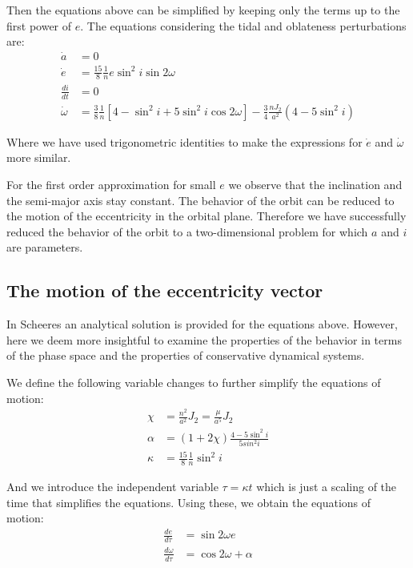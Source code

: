 Then the equations above can be simplified by keeping only the terms up to the first power of $e$. The equations considering the tidal and oblateness perturbations are:
\begin{align}
\dot{a} &= 0\\
\dot{e} &= \frac{15}{8} \frac{1}{n} e \sin^2 i \sin 2\omega\\
\frac{di}{dt} &= 0\\
\dot{\omega} &= \frac{3}{8} \frac{1}{n}\left[4 - \sin^2 i+ 5 \sin^2 i \cos 2\omega \right] -\frac{3}{4} \frac{n J_2 }{a^2} \left(4 - 5 \sin^2 i\right)
\end{align}

Where we have used trigonometric identities to make the expressions for $\dot{e}$ and $\dot{\omega}$ more similar.

For the first order approximation for small $e$ we observe that the inclination and the semi-major axis stay constant. The behavior of the orbit can be reduced to the motion of the eccentricity in the orbital plane. Therefore we have successfully reduced the behavior of the orbit to a two-dimensional problem for which $a$ and $i$ are parameters.

\subsection{The motion of the eccentricity vector}
In Scheeres \cite{scheeres2001stability} an analytical solution is provided for the equations above. However, here we deem more insightful to examine the properties of the behavior in terms of the phase space and the properties of conservative dynamical systems.

We define the following variable changes to further simplify the equations of motion:
\begin{align}
\chi &= \frac{n^2}{a^2} J_2 = \frac{\mu}{a^5} J_2 \\
\alpha &= (1+ 2\chi) \frac{4 - 5 \sin^2 i}{5 sin^2 i} \\
\kappa &= \frac{15}{8} \frac{1}{n} \sin^2 i
\end{align}

And we introduce the independent variable $\tau = \kappa t$ which is just a scaling of the time that simplifies the equations. Using these, we obtain the equations of motion:
\begin{align}
\frac{de}{d\tau} &= \sin 2\omega e \\
\label{domegadtau}
\frac{d\omega}{d\tau} &= \cos 2\omega+ \alpha
\end{align}

